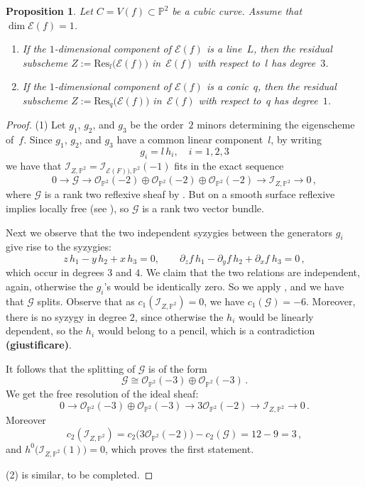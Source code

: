 \documentclass{amsart}
\theoremstyle{plain}
\newtheorem{prop}[lemma]{Proposition}
\theoremstyle{definition}
\newcommand{\p}{\mathbb{P}}
\newcommand{\oo}{\mathcal{O}}
\newcommand{\Eig}[1]{\mathcal{E}\!\left( {#1} \right)}
\begin{document}
\begin{prop}\label{p2}
Let $C = V(f) \subset \p^2$ be a cubic curve.
Assume that $\dim \Eig{f} = 1$.
\begin{enumerate}
\item If the $1$-dimensional component of $\Eig{f}$ is a line~$L$,
then the residual subscheme $Z := \mathrm{Res}_l \bigl( \Eig{f} \bigr)$ in~$\Eig{f}$ with respect to~$l$ has degree~$3$.
\item If the $1$-dimensional component of $\Eig{f}$ is a conic~$q$,
then the residual subscheme $Z := \mathrm{Res}_q \bigl( \Eig{f} \bigr)$ in~$\Eig{f}$ with respect to~$q$ has degree~$1$.
\end{enumerate}
\end{prop}
\begin{proof}
(1)
Let $g_1$, $g_2$, and $g_3$ be the order~$2$ minors determining the eigenscheme of~$f$.
Since $g_1$, $g_2$, and $g_3$ have a common linear component~$l$, by writing
\[
 g_i = l \, h_i, \quad i=1,2,3
\]
we have that $\mathcal{I}_{Z, \p^2} = \mathcal{I}_{\Eig{F}), \p^2} (-1)$
fits in the exact sequence
\[
 0 \to \mathcal{G} \to \oo_{\p^2} (-2) \oplus \oo_{\p^2} (-2) \oplus \oo_{\p^2} (-2) \to \mathcal{I}_{Z,\p^2} \to 0 \,,
\]
where $\mathcal{G}$ is a rank two reflexive sheaf by \cite[Proposition 1]{Hartshorne1980}.
But on a smooth surface reflexive implies locally free (see \cite[Example~1.1.6]{Huybrechts2010}),
so $\mathcal{G}$ is a rank two vector bundle.

Next we observe that the two independent
syzygies between the generators $g_i$ give rise to the syzygies:
\[
z\, h_1 - y\, h_2 + x\, h_3 = 0, \qquad \partial_z f\, h_1 - \partial_y f \, h_2 + \partial_x f \ h_3=0 \,,
\]
which occur in degrees $3$ and $4$. We claim that the two relations are independent, again,
otherwise the $g_i$'s would be identically zero. So we apply \cite[Proposition~12]{Ellia2020}, and we have that $\mathcal {G}$ splits. Observe that as $c_1(\mathcal {I}_{Z,\p^2})=0$, we have $c_1(\mathcal {G})=-6$. Moreover, there is no syzygy in degree $2$, since
otherwise the $h_i$ would be linearly dependent, so the $h_i$ would belong to a pencil, which is a contradiction \textbf{(giustificare)}.

It follows that the splitting of $\mathcal{G}$ is of the form
%
\[
\mathcal{G} \cong \oo_{\p^2} (-3) \oplus \oo_{\p^2} (-3) \,.
\]
%
We get the free resolution of the ideal sheaf:
%
\[
0\to \oo_{\p^2} (-3)\oplus \oo_{\p^2} (-3) \to 3\oo_{\p^2} (-2)\to \mathcal {I}_{Z,\p^2} \to 0 \,.
\]
%
Moreover
%
\[
c_2 (\mathcal{I}_{Z,\p^2} ) = c_2 \bigl( 3\oo_{\p^2}(-2) \bigr) - c_2 (\mathcal{G}) = 12 - 9 = 3 \,,
\]
%
and $h^0 \bigl( \mathcal{I}_{Z,\p^2}(1) \bigr) = 0$, which proves the first statement.

\medskip
(2) is similar, to be completed.
\end{proof}
\end{document}
